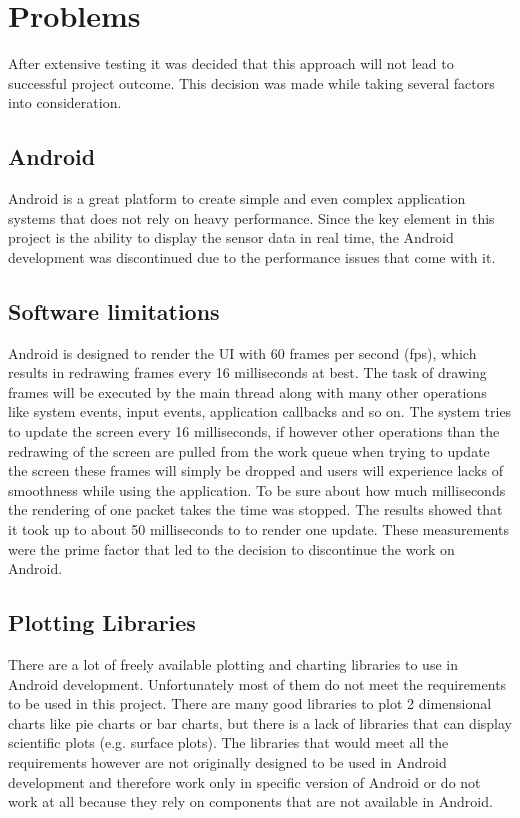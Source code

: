 \chapter{Problems}
\label{ch:Problems}

\author{Nico Leidenfrost}
%
After extensive testing it was decided that this approach will not lead to successful project outcome. This decision was made while taking several factors into consideration.

\section{Android}
Android is a great platform to create simple and even complex application systems that does not rely on heavy performance. Since the key element in this project is the ability to display the sensor data in real time, the Android development was discontinued due to the performance issues that come with it.

\section{Software limitations}
Android is designed to render the UI with 60 frames per second (fps), which results in redrawing frames every 16 milliseconds at best. The task of drawing frames will be executed by the main thread along with many other operations like system events, input events, application callbacks and so on. The system tries to update the screen every 16 milliseconds, if however other operations than the redrawing of the screen are pulled from the work queue when trying to update the screen these frames will simply be dropped and users will experience lacks of smoothness while using the application. To be sure about how much milliseconds the rendering of one packet takes the time was stopped. The results showed that it took up to about 50 milliseconds to to render one update. These measurements were the prime factor that led to the decision to discontinue the work on Android.

\section{Plotting Libraries}
There are a lot of freely available plotting and charting libraries to use in Android development. Unfortunately most of them do not meet the requirements to be used in this project. There are many good libraries to plot 2 dimensional charts like pie charts or bar charts, but there is a lack of libraries that can display scientific plots (e.g. surface plots). The libraries that would meet all the requirements however are not originally designed to be used in Android development and therefore work only in specific version of Android or do not work at all because they rely on components that are not available in Android.

